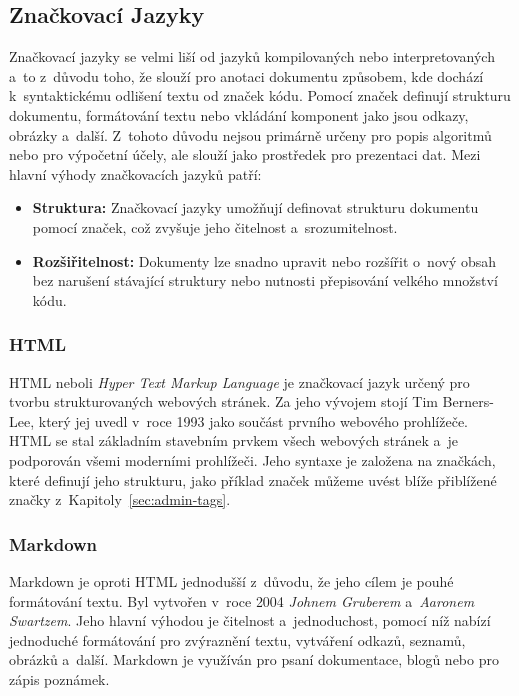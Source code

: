 \subsection{Značkovací Jazyky}
\label{subsec:languages-markup}
Značkovací jazyky se velmi liší od jazyků kompilovaných nebo interpretovaných a~to z~důvodu toho, že slouží pro anotaci dokumentu způsobem, kde dochází k~syntaktickému odlišení textu od značek kódu. Pomocí značek definují strukturu dokumentu, formátování textu nebo vkládání komponent jako jsou odkazy, obrázky a~další. Z~tohoto důvodu nejsou primárně určeny pro popis algoritmů nebo pro výpočetní účely, ale slouží jako prostředek pro prezentaci dat. Mezi hlavní výhody značkovacích jazyků patří:

\begin{itemize}
    \item \textbf{Struktura:} Značkovací jazyky umožňují definovat strukturu dokumentu pomocí značek, což zvyšuje jeho čitelnost a~srozumitelnost.
    \item \textbf{Rozšiřitelnost:} Dokumenty lze snadno upravit nebo rozšířit o~nový obsah bez narušení stávající struktury nebo nutnosti přepisování velkého množství kódu.
\end{itemize}

\subsubsection*{HTML}
\label{subsubsec:languages-markup-html}
HTML neboli \textit{Hyper Text Markup Language} je značkovací jazyk určený pro tvorbu strukturovaných webových stránek. Za jeho vývojem stojí Tim Berners-Lee, který jej uvedl v~roce 1993 jako součást prvního webového prohlížeče. HTML se stal základním stavebním prvkem všech webových stránek a~je podporován všemi moderními prohlížeči. Jeho syntaxe je založena na značkách, které definují jeho strukturu, jako příklad značek můžeme uvést blíže přiblížené značky z~Kapitoly~\ref{sec:admin-tags}.

\subsubsection*{Markdown}
\label{subsubsec:languages-markup-markdown}
Markdown je oproti HTML jednodušší z~důvodu, že jeho cílem je pouhé formátování textu. Byl vytvořen v~roce 2004 \textit{Johnem Gruberem} a~\textit{Aaronem Swartzem}. Jeho hlavní výhodou je čitelnost a~jednoduchost, pomocí níž nabízí jednoduché formátování pro zvýraznění textu, vytváření odkazů, seznamů, obrázků a~další. Markdown je využíván pro psaní dokumentace, blogů nebo pro zápis poznámek.

